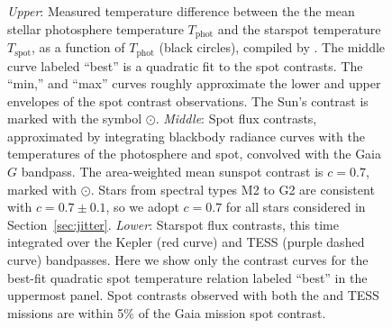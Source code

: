 \begin{figure}
\centering
\caption{{\sl Upper}: Measured temperature difference between the the mean stellar photosphere temperature $T_{\mathrm{phot}}$ and the starspot temperature $T_{\mathrm{spot}}$, as a function of $T_{\mathrm{phot}}$ (black circles), compiled by \citet{Berdyugina2005}. The middle curve labeled ``best'' is a quadratic fit to the spot contrasts. The  ``min,'' and ``max'' curves roughly approximate the lower and upper envelopes of the spot contrast observations. The Sun's contrast is marked with the symbol $\odot$. 
{\sl Middle}: Spot flux contrasts, approximated by integrating blackbody radiance curves with the temperatures of the photosphere and spot, convolved with the Gaia $G$ bandpass. The area-weighted mean sunspot contrast is $c=0.7$, marked with $\odot$. Stars from spectral types M2 to G2 are consistent with $c=0.7\pm0.1$, so we adopt $c=0.7$ for all stars considered in Section~\ref{sec:jitter}.
{\sl Lower}: Starspot flux contrasts, this time integrated over the Kepler (red curve) and TESS (purple dashed curve) bandpasses. Here we show only the contrast curves for the best-fit quadratic spot temperature relation labeled ``best'' in the uppermost panel. Spot contrasts observed with both the \kepler and TESS missions are within 5\% of the Gaia mission spot contrast.
\label{fig:contrast}}

\end{figure}

